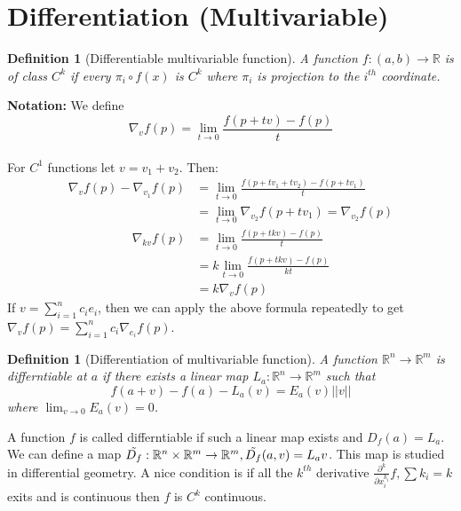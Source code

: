 \documentclass[oneside]{book}\twocolumn
\newtheorem{definition}[theorem]{Definition}
\begin{document}
\section{Differentiation (Multivariable)}
\begin{definition}[Differentiable multivariable function]
A function $f:(a,b)\to\mathbb R$ is of class $C^k$ if every $\pi_i\circ f(x)$ is $C^k$ where $\pi_i$ is projection to the $i^{th}$ coordinate.
\end{definition}
\textbf{Notation:} We define $$\nabla_vf(p)=\lim_{t\to 0}\frac{f(p+tv)-f(p)}{t} $$\\
For $C^1$ functions let $v=v_1+v_2$. Then:
\begin{align*}
    \nabla_vf(p)-\nabla_{v_1}f(p)&=\lim_{t\to0}\frac{f(p+tv_1+tv_2)-f(p+tv_1)}{t}\\
    &=\lim_{t\to0}\nabla_{v_2}f(p+tv_1)=\nabla_{v_2}f(p) 
\end{align*}
\begin{align*}
    \nabla_{kv}f(p)&=\lim_{t\to0}\frac{f(p+tkv)-f(p)}{t}\\
    &=k\lim_{t\to0}\frac{f(p+tkv)-f(p)}{kt}\\
    &=k\nabla_vf(p)    
\end{align*}
If $v=\sum_{i=1}^nc_ie_i$, then we can apply the above formula repeatedly to get   $\nabla_vf(p)=\sum_{i=1}^nc_i\nabla_{e_i}f(p)$.
\begin{definition}[Differentiation of multivariable function]
A function $\mathbb R^n\to\mathbb R^m$ is differntiable at $a$ if there exists a linear map $L_a:\mathbb R^n\to\mathbb R^m$ such that
$$f(a+v)-f(a)-L_a(v)=E_a(v)||v||$$
where $\lim_{v\to 0}E_a(v)=0$.
\end{definition}
A function $f$ is called differntiable if such a linear map exists and $D_f(a)=L_a$. We can define a map $\Tilde{D_f}:\mathbb R^n\times\mathbb R^m\to\mathbb R^m,\Tilde{D_f}(a,v)=L_av$. This map is studied in differential geometry. 
A nice condition is if all the $k^{th}$ derivative $\frac{\partial^k}{\partial x_i^{k_i}}f,\sum k_i=k$ exits and is continuous then $f$ is $C^k$ continuous. 
\end{document}
